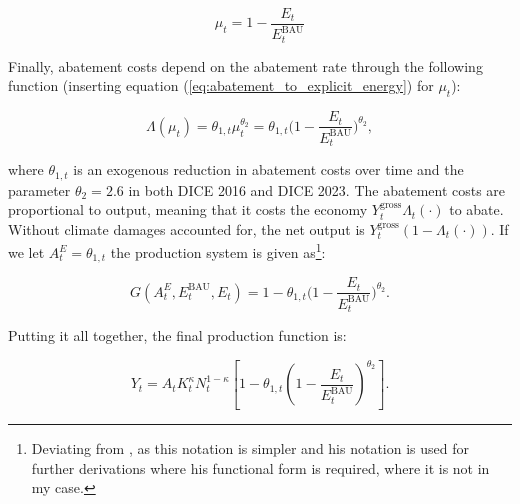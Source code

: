 \begin{equation}
    \mu_t = 1 - \frac{E_t}{E_t^{\text{BAU}}}
\label{eq:abatement_to_explicit_energy}
\end{equation}

Finally, abatement costs depend on the abatement rate through the following function (inserting equation (\ref{eq:abatement_to_explicit_energy}) for \(\mu_t\)):

\begin{equation}
    \Lambda(\mu_t) = \theta_{1,t} \mu_t^{\theta_2} = 
    \theta_{1,t} \Bigg(1 - \frac{E_t}{E_t^{\text{BAU}}}\Bigg)^{\theta_2},
\end{equation}

where \(\theta_{1,t}\) is an exogenous reduction in abatement costs over time and the parameter \(\theta_2 = 2.6\) in both DICE 2016 and DICE 2023. The abatement costs are proportional to output, meaning that it costs the economy \(Y_t^{\text{gross}}\Lambda_t(\cdot)\) to abate. Without climate damages accounted for, the net output is \(Y_t^{\text{gross}}(1-\Lambda_t(\cdot))\). If we let \(A_t^E = \theta_{1,t}\) the production system is given as\footnote{Deviating from \textcite{traeger2021analytic_discussion}, as this notation is simpler and his notation is used for further derivations where his functional form is required, where it is not in my case.}:

\begin{equation}
    G(A_t^E, E_t^{\text{BAU}}, E_t) = 
    1 - \theta_{1,t} \Bigg(1 - \frac{E_t}{E_t^{\text{BAU}}}\Bigg)^{\theta_2} .
\end{equation}

Putting it all together, the final production function is:

\begin{equation}
    Y_t = A_tK_t^\kappa N_t^{1-\kappa} 
    \left[ 
        1 - \theta_{1,t} \left(
            1 - \frac{E_t}{E_t^{\text{BAU}}} 
        \right)^{\theta_2}
    \right] .
\end{equation}
